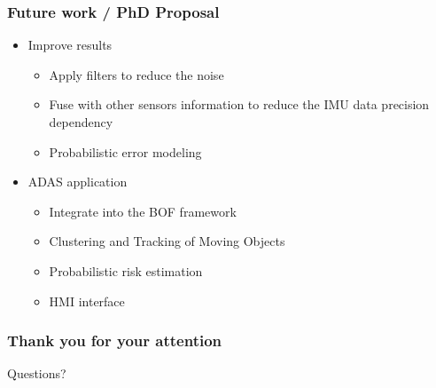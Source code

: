 \documentclass{beamer}
\begin{document}
	\begin{frame}
		\frametitle{Future work / PhD Proposal}

			\begin{itemize}
			\item Improve results 
			
				\begin{itemize}
				\item Apply filters to reduce the noise
				\item Fuse with other sensors information to reduce the IMU data precision dependency
				\item Probabilistic error modeling
				\end{itemize}			
				
			\item ADAS application
			
				\begin{itemize}
				\item Integrate into the BOF framework
				\item Clustering and Tracking of Moving Objects
				\item Probabilistic risk estimation
				\item HMI interface
				\end{itemize}

			\end{itemize}
		
	\end{frame}

	\begin{frame}
		\frametitle{Thank you for your attention}	
	
	\begin{alertblock}{}
		\centering
		Questions?
	\end{alertblock}
	\end{frame} 	

 	
{} 	
\end{document}

